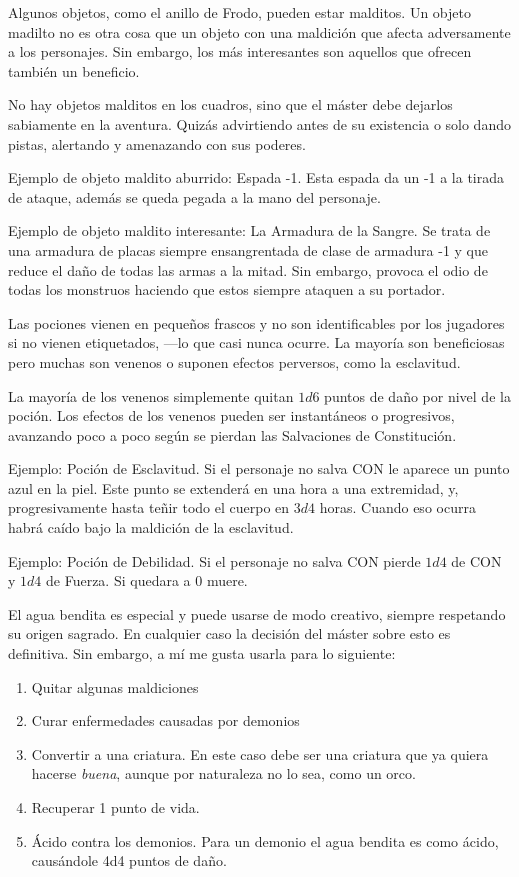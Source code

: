 \begin{multicols}{2}

Algunos objetos, como el anillo de Frodo, pueden estar malditos. Un objeto madilto
no es otra cosa que un objeto con una maldición que afecta adversamente a los
personajes. Sin embargo, los más interesantes son aquellos que ofrecen también un
beneficio.

No hay objetos malditos en los cuadros, sino que el máster debe dejarlos sabiamente
en la aventura. Quizás advirtiendo antes de su existencia o solo dando pistas, alertando
y amenazando con sus poderes.

Ejemplo de objeto maldito aburrido: Espada -1. Esta espada da un -1 a la tirada de
ataque, además se queda pegada a la mano del personaje.

Ejemplo de objeto maldito interesante: La Armadura de la Sangre. Se trata de una
armadura de placas siempre ensangrentada de clase de armadura -1 y que reduce el
daño de todas las armas a la mitad. Sin embargo, provoca el odio de todas los monstruos
haciendo que estos siempre ataquen a su portador.


Las pociones vienen en pequeños frascos y no son identificables por los jugadores
si no vienen etiquetados, ---lo que casi nunca ocurre. La mayoría son beneficiosas
pero muchas son venenos o suponen efectos perversos, como la esclavitud.

La mayoría de los venenos simplemente quitan $ 1d6$ puntos de daño por nivel de la
poción. Los efectos de los venenos pueden ser instantáneos o progresivos, avanzando
poco a poco según se pierdan las Salvaciones de Constitución.

Ejemplo: Poción de Esclavitud. Si el personaje no salva CON le aparece un punto azul
en la piel. Este punto se extenderá en una hora a una extremidad, y, progresivamente
hasta teñir todo el cuerpo en $ 3d4$ horas. Cuando eso ocurra habrá caído bajo la maldición
de la esclavitud.

Ejemplo: Poción de Debilidad. Si el personaje no salva CON pierde $ 1d4$ de CON y $ 1d4$ de Fuerza.
Si quedara a 0 muere.


El agua bendita es especial y puede usarse de modo creativo, siempre respetando
su origen sagrado. En cualquier caso la decisión del máster sobre esto es definitiva.
Sin embargo, a mí me gusta usarla para lo siguiente:

\begin{enumerate}[label={\alph*)}]
\item Quitar algunas maldiciones
\item Curar enfermedades causadas por demonios
\item Convertir a una criatura. En este caso debe ser una criatura que ya quiera hacerse \emph{buena}, aunque por naturaleza no lo sea, como un orco.
\item Recuperar 1 punto de vida.
\item Ácido contra los demonios. Para un demonio el agua bendita es como ácido, causándole 4d4 puntos de daño.
\end{enumerate}


\end{multicols}
